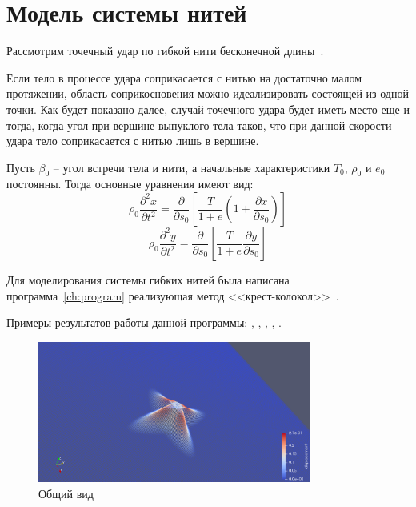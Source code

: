 \section{Модель системы нитей}\label{sec:eq-fibers}
Рассмотрим точечный удар по гибкой нити бесконечной длины~\cite{rakhmatulin}.

Если тело в процессе удара соприкасается с нитью на достаточно малом протяжении, область соприкосновения можно
идеализировать состоящей из одной точки.
Как будет показано далее, случай точечного удара будет иметь место еще и тогда, когда угол при вершине выпуклого
тела таков, что при данной скорости удара тело соприкасается с нитью лишь в вершине.

Пусть $\beta_0$ -- угол встречи тела и нити, а начальные характеристики $T_0$, $\rho_0$ и $e_0$ постоянны.
Тогда основные уравнения имеют вид:
\begin{equation}
    \rho_0 \dfrac{\partial^2 x}{\partial t^2} = \dfrac{\partial}{\partial s_0} \left[ \dfrac{T}{1 + e} \left( 1 + \dfrac{\partial x}{\partial s_0} \right) \right]
\end{equation}
\begin{equation}
    \rho_0 \dfrac{\partial^2 y}{\partial t^2} = \dfrac{\partial}{\partial s_0} \left[ \dfrac{T}{1 + e} \dfrac{\partial y}{\partial s_0} \right]
\end{equation}

Для моделирования системы гибких нитей была написана программа~\ref{ch:program} реализующая метод
<<крест-колокол>>~\cite{rakhmatulin}.

Примеры результатов работы данной программы: ,
, ,
, .

\begin{figure}[H]
    \centering
    \label{pic:fiber-example-overview}
    \includegraphics[width=0.8\textwidth]{img/fiber/example_overview.png}
    \caption{Общий вид}
\end{figure}

